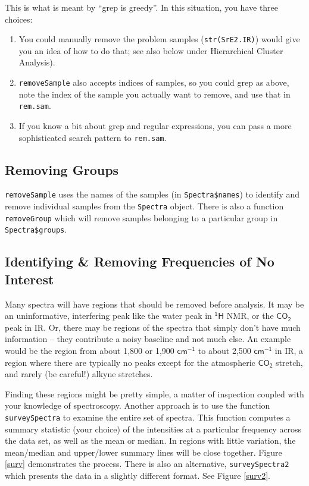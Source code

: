 \documentclass[letter,10pt,twocolumn,twoside,printwatermark=false]{pinp}
\begin{document}
This is what is meant by ``grep is greedy''. In this situation, you have
three choices:

\begin{enumerate}
  \item You could manually remove the problem samples (\texttt{str(SrE2.IR)}) would give you an idea of how to do that; see also below under Hierarchical Cluster Analysis).
  \item \texttt{removeSample} also accepts indices of samples, so you could grep as above, note the index of the sample you actually want to remove, and use that in \texttt{rem.sam}.
  \item If you know a bit about grep and regular expressions, you can pass a more sophisticated search pattern to \texttt{rem.sam}.
\end{enumerate}

\hypertarget{removing-groups}{%
\subsection{Removing Groups}\label{removing-groups}}

\texttt{removeSample} uses the names of the samples (in
\texttt{Spectra\$names}) to identify and remove individual samples from
the \texttt{Spectra} object. There is also a function
\texttt{removeGroup} which will remove samples belonging to a particular
group in \texttt{Spectra\$groups}.

\hypertarget{identifying-removing-frequencies-of-no-interest}{%
\subsection{Identifying \& Removing Frequencies of No
Interest}\label{identifying-removing-frequencies-of-no-interest}}

Many spectra will have regions that should be removed before analysis.
It may be an uninformative, interfering peak like the water peak in
\(\mathsf{^{1}H}\) NMR, or the \(\mathsf{CO_2}\) peak in IR. Or, there
may be regions of the spectra that simply don't have much information --
they contribute a noisy baseline and not much else. An example would be
the region from about 1,800 or 1,900 \(\mathsf{cm^{-1}}\) to about 2,500
\(\mathsf{cm^{-1}}\) in IR, a region where there are typically no peaks
except for the atmospheric \(\mathsf{CO_2}\) stretch, and rarely (be
careful!) alkyne stretches.

Finding these regions might be pretty simple, a matter of inspection
coupled with your knowledge of spectroscopy. Another approach is to use
the function \texttt{surveySpectra} to examine the entire set of
spectra. This function computes a summary statistic (your choice) of the
intensities at a particular frequency across the data set, as well as
the mean or median. In regions with little variation, the mean/median
and upper/lower summary lines will be close together. Figure \ref{surv}
demonstrates the process. There is also an alternative,
\texttt{surveySpectra2} which presents the data in a slightly different
format. See Figure \ref{surv2}.
\end{document}
